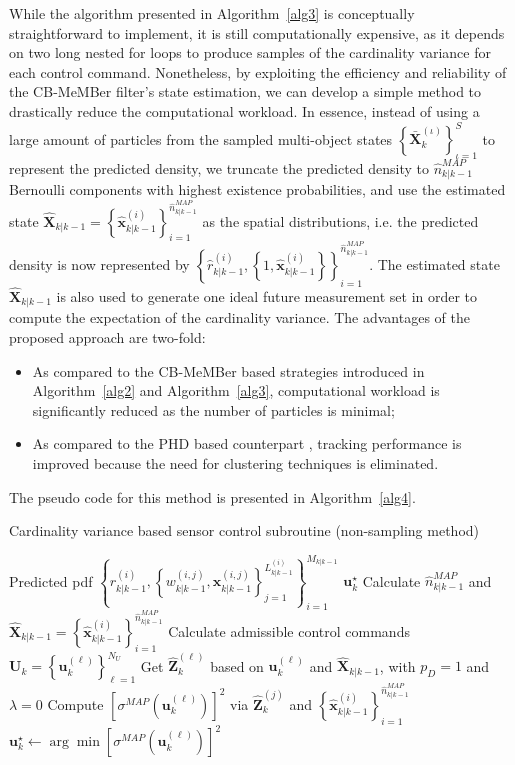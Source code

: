 \documentclass[twocolumn]{autart}
\begin{document}
While the algorithm presented in Algorithm~\ref{alg3} is conceptually straightforward to implement, it is still computationally expensive, as it depends on two long nested for loops to produce samples of the cardinality variance for each control command. Nonetheless, by exploiting the
efficiency and reliability of the CB-MeMBer filter's state estimation, we can develop a
simple method to drastically reduce the computational workload.
In essence, instead of using a large amount of particles from the sampled multi-object states $\left\{\mathbf{\bar{X}}_{k}^{(\iota)}\right\}_{\iota=1}^{S}$ to represent the predicted density, we truncate the predicted density to $\hat{n}_{k|k-1}^{MAP}$ Bernoulli components with highest existence probabilities, and
use the estimated state $\mathbf{\hat{X}}_{k|k-1}=\left\{ \mathbf{\hat{x}}_{k|k-1}^{(i)}\right\} _{i=1}^{\hat{n}_{k|k-1}^{MAP}}$ as the spatial
distributions, i.e. the predicted density is now represented by $\left\{
\hat{r}_{k|k-1}^{(i)},\left\{ 1,{\mathbf{\hat{x}}_{k|k-1}^{(i)}}\right\}
\right\} _{i=1}^{\hat{n}_{k|k-1}^{MAP}}$. The estimated state $\mathbf{\hat{X}}_{k|k-1}$ is also used to generate one ideal future measurement set in order to compute the expectation of the cardinality variance. The advantages of the proposed approach are two-fold:
\begin{itemize}
\item As compared to the CB-MeMBer based strategies introduced in Algorithm~\ref{alg2} and Algorithm~\ref{alg3}, computational workload is significantly reduced as the number of particles is minimal;
\item As compared to the PHD based counterpart \cite{RVC11}, tracking performance is improved because the need for clustering techniques is eliminated.
\end{itemize}
The pseudo code for this method is presented in Algorithm~\ref{alg4}.
\begin{algorithm}[htb]
\caption{Cardinality variance based sensor control subroutine (non-sampling method)}
\label{alg4}
\begin{algorithmic}[1]
    \Require Predicted pdf $\left\lbrace r_{k|k-1}^{(i)}, \left\lbrace w_{k|k-1}^{(i,j)},\mathbf{x}_{k|k-1}^{(i,j)}\right\rbrace_{j=1}^{L_{k|k-1}^{(i)}}\right\rbrace_{i=1}^{M_{k|k-1}}$
    \Ensure $\mathbf{u}_k^\star$
    \State Calculate $\hat{n}^{MAP}_{k|k-1}$ and $\mathbf{\hat{X}}_{k|k-1}=\left\{\mathbf{\hat{x}}_{k|k-1}^{(i)}\right\}_{i=1}^{\hat{n}^{MAP}_{k|k-1}}$
    \State Calculate admissible control commands $\mathbf{U}_k=\left\{\mathbf{u}_k^{(\ell)}\right\}_{\ell=1}^{N_U}$
    \State Get $\mathbf{\hat{Z}}_{k}^{(\ell)}$ based on $\mathbf{u}_k^{(\ell)}$ and $\mathbf{\hat{X}}_{k|k-1}$, with $p_D=1$
    \Statex \quad\; and $\lambda=0$
    \State Compute $\left[\sigma^{MAP}\left(\mathbf{u}_k^{(\ell)}\right)\right]^2$  via $\mathbf{\hat{Z}}_{k}^{(j)}$ and 
    \Statex \quad\; $\left\{\mathbf{\hat{x}}_{k|k-1}^{(i)}\right\}_{i=1}^{\hat{n}^{MAP}_{k|k-1}}$
    \EndFor
    \State $\mathbf{u}_k^\star \gets \arg\min \left[\sigma^{MAP}\left(\mathbf{u}_k^{(\ell)}\right)\right]^2$
\end{algorithmic}
\end{algorithm}
\end{document}
